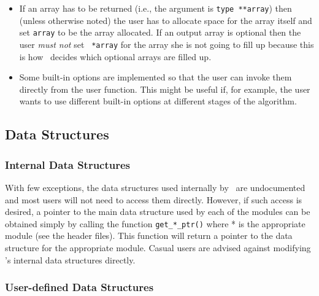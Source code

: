 \begin{description}
\begin{itemize}
\item If an array has to be returned (i.e., the argument is {\tt type
**array}) then (unless otherwise noted) the user has to allocate space
for the array itself and set {\tt *array} to be the array allocated.
If an output array is optional then the user {\em must not} set {\tt
*array} for the array she is not going to fill up because this is how
\BB\ decides which optional arrays are filled up.

\item Some built-in options are implemented so that the user can invoke them
directly from the user function. This might be useful if, for example,
the user wants to use different built-in options at different stages
of the algorithm.
\end{itemize}

\end{description}

\subsection{Data Structures}

\subsubsection{Internal Data Structures}

With few exceptions, the data structures used internally by \BB\
are undocumented and most users will not need to access them
directly. However, if such access is desired, a pointer to the main data
structure used by each of the modules can be obtained simply by calling
the function {\tt get\_*\_ptr()} where * is the appropriate module (see the
header files). This function will return a pointer to the data
structure for the appropriate module. Casual users are advised against
modifying \BB's internal data structures directly.

\subsubsection{User-defined Data Structures}

